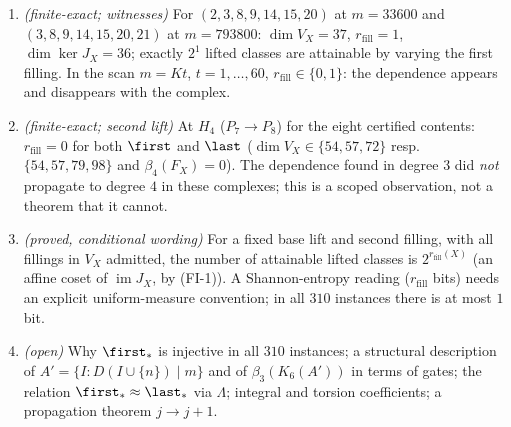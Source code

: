 \begin{theorem}
\begin{enumerate}[label=(J-\arabic*)]
\item \emph{(finite-exact; witnesses)} For $(2,3,8,9,14,15,20)$ at $m=33600$ and $(3,8,9,14,15,20,21)$ at $m=793800$: $\dim V_X=37$, $r_{\mathrm{fill}}=1$, $\dim\ker J_X=36$; exactly $2^1$ lifted classes are attainable by varying the first filling. In the scan $m=Kt$, $t=1,\dots,60$, $r_{\mathrm{fill}}\in\{0,1\}$: the dependence appears and disappears with the complex.
\item \emph{(finite-exact; second lift)} At $H_4$ ($P_7\to P_8$) for the eight certified contents: $r_{\mathrm{fill}}=0$ for both $\first$ and $\last$ ($\dim V_X\in\{54,57,72\}$ resp.\ $\{54,57,79,98\}$ and $\beta_4(F_X)=0$). The dependence found in degree $3$ did \emph{not} propagate to degree $4$ in these complexes; this is a scoped observation, not a theorem that it cannot.
\item \emph{(proved, conditional wording)} For a fixed base lift and second filling, with all fillings in $V_X$ admitted, the number of attainable lifted classes is $2^{r_{\mathrm{fill}}(X)}$ (an affine coset of $\operatorname{im}J_X$, by (FI-1)). A Shannon-entropy reading ($r_{\mathrm{fill}}$ bits) needs an explicit uniform-measure convention; in all $310$ instances there is at most $1$ bit.
\item \emph{(open)} Why $\first_\ast$ is injective in all $310$ instances; a structural description of $A'=\{I:D(I\cup\{n\})\mid m\}$ and of $\beta_3(K_6(A'))$ in terms of gates; the relation $\first_\ast\approx\last_\ast$ via $\Lambda$; integral and torsion coefficients; a propagation theorem $j\to j+1$.
\end{enumerate}
\end{theorem}
